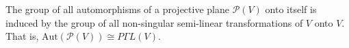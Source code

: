 The group of all automorphisms of a projective plane $\mathcal{P}(V)$ onto itself is induced by the group of all non-singular semi-linear transformations of $V$ onto $V$. That is, $\mathrm{Aut}(\mathcal{P}(V)) \cong P\Gamma L(V)$.
